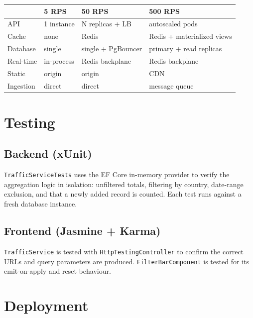 \documentclass[11pt,a4paper]{article}
\newcommand{\code}[1]{\texttt{\small #1}}
\begin{document}
\begin{center}
\begin{tabular}{@{}llll@{}}
\toprule
 & \textbf{5 RPS} & \textbf{50 RPS} & \textbf{500 RPS} \\
\midrule
API        & 1 instance     & N replicas + LB      & autoscaled pods \\
Cache      & none           & Redis               & Redis + materialized views \\
Database   & single         & single + PgBouncer  & primary + read replicas \\
Real-time  & in-process     & Redis backplane     & Redis backplane \\
Static     & origin         & origin              & CDN \\
Ingestion  & direct         & direct              & message queue \\
\bottomrule
\end{tabular}
\end{center}

\section{Testing}
\subsection{Backend (xUnit)}
\code{TrafficServiceTests} uses the EF Core in-memory provider to verify the
aggregation logic in isolation: unfiltered totals, filtering by country,
date-range exclusion, and that a newly added record is counted. Each test runs
against a fresh database instance.

\subsection{Frontend (Jasmine + Karma)}
\code{TrafficService} is tested with \code{HttpTestingController} to confirm the
correct URLs and query parameters are produced. \code{FilterBarComponent} is
tested for its emit-on-apply and reset behaviour.

\section{Deployment}
\end{document}
